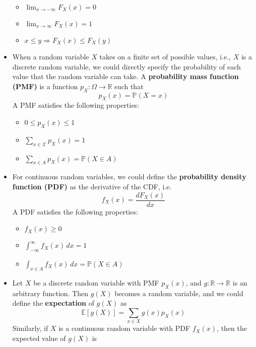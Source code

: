 \documentclass{article}
\begin{document}
\begin{itemize}
\begin{itemize}
        \item $\lim_{x \rightarrow -\infty} F_X(x) = 0$
        \item $\lim_{x \rightarrow \infty} F_X(x) = 1$
        \item $x \leq y \Rightarrow F_X(x) \leq F_X(y)$
    \end{itemize}
    \item When a random variable $X$ takes on a finite set of possible values, i.e., $X$ is a discrete random variable, we could directly specify the probability of each value that the random variable can take. A \textbf{probability mass function (PMF)} is a function $p_X : \Omega \rightarrow \mathbb{R}$ such that
    \begin{equation}
        p_X(x) = \mathbb{P}(X = x)
    \end{equation}
    A PMF satisfies the following properties:
    \begin{itemize}
        \item $0 \leq p_X(x) \leq 1$
        \item $\sum_{x \in \mathcal{X}} p_X(x) = 1$
        \item $\sum_{x \in A} p_X(x) = \mathbb{P}(X \in A)$
    \end{itemize}
    \item For continuous random variables, we could define the \textbf{probability density function (PDF)} as the derivative of the CDF, i.e.
    \begin{equation}
        f_X(x) = \frac{dF_X(x)}{dx}
    \end{equation}
    A PDF satisfies the following properties:
    \begin{itemize}
        \item $f_X(x) \geq 0$
        \item $\int_{-\infty}^{\infty} f_X(x)\,dx = 1$
        \item $\int_{x \in A} f_X(x)\,dx = \mathbb{P}(X \in A)$
    \end{itemize}
    \item Let $X$ be a discrete random variable with PMF $p_X(x)$, and $g : \mathbb{R} \rightarrow \mathbb{R}$ is an arbitrary function. Then $g(X)$ becomes a random variable, and we could define the \textbf{expectation} of $g(X)$ as
    \begin{equation}
        \mathbb{E}[g(X)] = \sum_{x \in X} g(x) p_X(x)
    \end{equation}
    Similarly, if $X$ is a continuous random variable with PDF $f_X(x)$, then the expected value of $g(X)$ is

\end{itemize}
\end{document}
